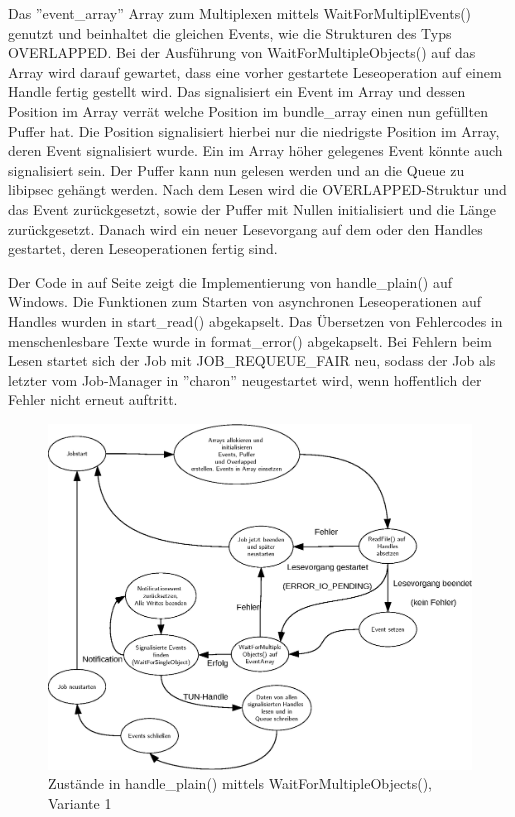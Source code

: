 {Das ''event\_array'' Array zum Multiplexen mittels WaitForMultiplEvents() genutzt und
beinhaltet die gleichen Events, wie die Strukturen des Typs OVERLAPPED.
Bei der Ausführung von WaitForMultipleObjects() auf das Array wird darauf gewartet, dass
eine vorher gestartete Leseoperation auf einem Handle fertig gestellt wird.
Das signalisiert ein Event im Array und dessen Position im Array verrät welche
Position im bundle\_array einen nun gefüllten Puffer hat. Die Position signalisiert
hierbei nur die niedrigste Position im Array, deren Event signalisiert wurde. Ein
im Array höher gelegenes Event könnte auch signalisiert sein.
Der Puffer kann nun gelesen
werden und an die Queue zu libipsec gehängt werden. Nach dem Lesen wird die OVERLAPPED-Struktur
und das Event zurückgesetzt, sowie der Puffer mit Nullen initialisiert und die Länge zurückgesetzt.
Danach wird ein neuer Lesevorgang auf dem oder den Handles gestartet, deren Leseoperationen
fertig sind.

Der Code in auf Seite \pageref{lst:handle-plain-windows} zeigt die Implementierung von handle\_plain()
auf Windows. Die Funktionen zum Starten von asynchronen Leseoperationen auf Handles
wurden in start\_read() abgekapselt. Das Übersetzen von Fehlercodes in menschenlesbare
Texte wurde in format\_error() abgekapselt. Bei Fehlern beim Lesen startet sich der Job
mit JOB\_REQUEUE\_FAIR neu, sodass der Job als letzter vom Job-Manager in ''charon'' neugestartet wird,
wenn hoffentlich der Fehler nicht erneut auftritt.

\begin{figure}
\centering
\def\svgwidth{\columnwidth}
\includegraphics[width=\textwidth]{WaitForMultipleObjects.eps}
\caption{Zustände in handle\_plain() mittels WaitForMultipleObjects(), Variante 1}
\label{fig:WaitForMultipleObjects}
\end{figure}

}
